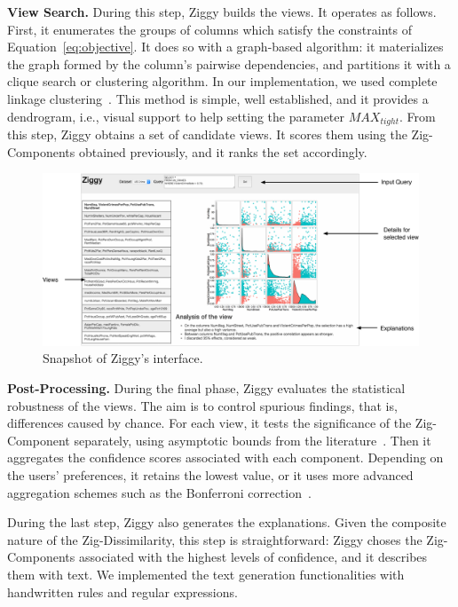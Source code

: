 \textbf{View Search.} During this step, Ziggy builds the views. It operates as
follows. First, it enumerates the groups of columns which satisfy the
constraints of Equation~\ref{eq:objective}.  It does so with a graph-based
algorithm: it materializes the graph formed by the column's pairwise
dependencies, and partitions it with a clique search or clustering algorithm.
In our implementation, we used complete linkage
clustering~\cite{wasserman2013all}. This method is simple, well established,
and it provides a dendrogram, i.e.,  visual support to help setting the
parameter $\mathit{MAX}_{tight}$.  From this step, Ziggy obtains a set of candidate
views.  It scores them using the Zig-Components obtained previously, and it
ranks the set accordingly.
\begin{figure}[!th]
    \centering
    \includegraphics[width=.96\textwidth]{Images/ScreenDetail}
    \caption{Snapshot of Ziggy's interface.}
    \label{fig:screenshot}
\end{figure}


\textbf{Post-Processing.} During the final phase, Ziggy evaluates the
statistical robustness of the views. The aim is to control spurious findings,
that is, differences caused by chance. For each view, it tests the
significance of the Zig-Component separately, using asymptotic bounds from the
literature~\cite{hedges2014statistical}. Then it aggregates the confidence
scores associated with each component. Depending on the users' preferences, it
retains the lowest value, or it uses more advanced aggregation schemes such
as the Bonferroni correction~\cite{wasserman2013all}. 

During the last step, Ziggy also generates the explanations. Given the
composite nature of the Zig-Dissimilarity, this step is straightforward: Ziggy
choses the Zig-Components associated with the highest levels of confidence, and
it describes them with text. We implemented the text generation functionalities
with handwritten rules and  regular expressions.

